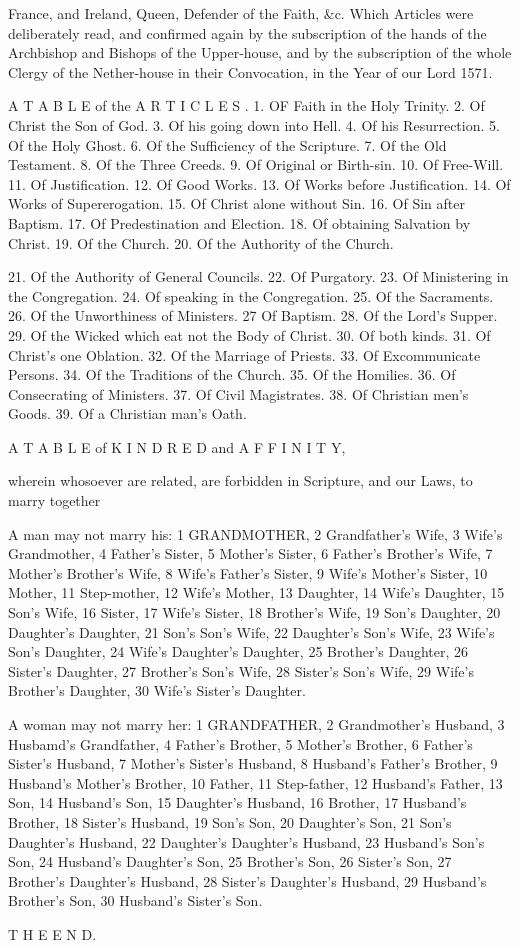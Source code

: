 France, and Ireland, Queen, Defender of the Faith, \&c. Which Articles were deliberately read, and confirmed again by the subscription of the hands of the Archbishop and Bishops of the Upper-house, and by the subscription of the whole Clergy of the Nether-house in their Convocation, in the Year of our Lord 1571.

A T A B L E of the A R T I C L E S . 1. OF Faith in the Holy Trinity. 2. Of Christ the Son of God. 3. Of his going down into Hell. 4. Of his Resurrection. 5. Of the Holy Ghost. 6. Of the Sufficiency of the Scripture. 7. Of the Old Testament. 8. Of the Three Creeds. 9. Of Original or Birth-sin. 10. Of Free-Will. 11. Of Justification. 12. Of Good Works. 13. Of Works before Justification. 14. Of Works of Supererogation. 15. Of Christ alone without Sin. 16. Of Sin after Baptism. 17. Of Predestination and Election. 18. Of obtaining Salvation by Christ. 19. Of the Church. 20. Of the Authority of the Church.

21. Of the Authority of General Councils. 22. Of Purgatory. 23. Of Ministering in the Congregation. 24. Of speaking in the Congregation. 25. Of the Sacraments. 26. Of the Unworthiness of Ministers. 27 Of Baptism. 28. Of the Lord’s Supper. 29. Of the Wicked which eat not the Body of Christ. 30. Of both kinds. 31. Of Christ’s one Oblation. 32. Of the Marriage of Priests. 33. Of Excommunicate Persons. 34. Of the Traditions of the Church. 35. Of the Homilies. 36. Of Consecrating of Ministers. 37. Of Civil Magistrates. 38. Of Christian men’s Goods. 39. Of a Christian man’s Oath.

A T A B L E of K I N D R E D and A F F I N I T Y,

wherein whosoever are related, are forbidden in Scripture, and our Laws, to marry together

A man may not marry his: 1 GRANDMOTHER, 2 Grandfather’s Wife, 3 Wife’s Grandmother, 4 Father’s Sister, 5 Mother’s Sister, 6 Father’s Brother’s Wife, 7 Mother’s Brother’s Wife, 8 Wife’s Father’s Sister, 9 Wife’s Mother’s Sister, 10 Mother, 11 Step-mother, 12 Wife’s Mother, 13 Daughter, 14 Wife’s Daughter, 15 Son's Wife, 16 Sister, 17 Wife’s Sister, 18 Brother’s Wife, 19 Son’s Daughter, 20 Daughter’s Daughter, 21 Son's Son’s Wife, 22 Daughter’s Son’s Wife, 23 Wife’s Son’s Daughter, 24 Wife’s Daughter’s Daughter, 25 Brother’s Daughter, 26 Sister’s Daughter, 27 Brother’s Son’s Wife, 28 Sister’s Son’s Wife, 29 Wife’s Brother’s Daughter, 30 Wife’s Sister’s Daughter.

A woman may not marry her: 1 GRANDFATHER, 2 Grandmother’s Husband, 3 Husbamd’s Grandfather, 4 Father’s Brother, 5 Mother’s Brother, 6 Father’s Sister’s Husband, 7 Mother’s Sister’s Husband, 8 Husband’s Father’s Brother, 9 Husband’s Mother’s Brother, 10 Father, 11 Step-father, 12 Husband’s Father, 13 Son, 14 Husband’s Son, 15 Daughter’s Husband, 16 Brother, 17 Husband’s Brother, 18 Sister’s Husband, 19 Son’s Son, 20 Daughter’s Son, 21 Son's Daughter’s Husband, 22 Daughter’s Daughter’s Husband, 23 Husband’s Son’s Son, 24 Husband’s Daughter’s Son, 25 Brother’s Son, 26 Sister’s Son, 27 Brother’s Daughter’s Husband, 28 Sister’s Daughter’s Husband, 29 Husband’s Brother’s Son, 30 Husband’s Sister’s Son.

T H E E N D.
